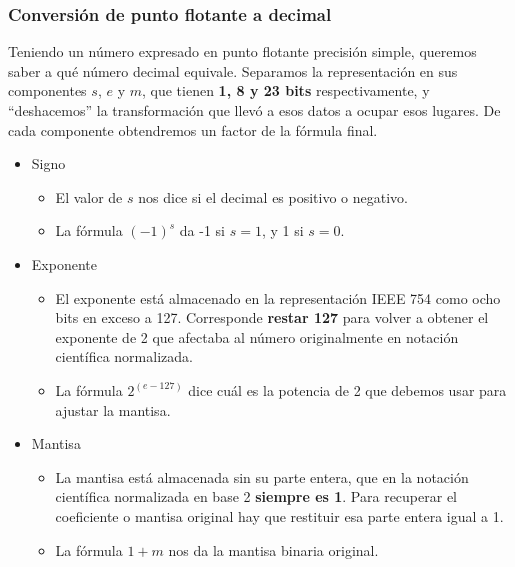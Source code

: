 \documentclass[spanish,A4,]{article}
\begin{document}
\subsubsection{Conversión de punto flotante a
decimal}\label{conversiuxf3n-de-punto-flotante-a-decimal}

Teniendo un número expresado en punto flotante precisión simple,
queremos saber a qué número decimal equivale. Separamos la
representación en sus componentes $s$, $e$ y $m$, que tienen \textbf{1,
8 y 23 bits} respectivamente, y ``deshacemos'' la transformación que
llevó a esos datos a ocupar esos lugares. De cada componente obtendremos
un factor de la fórmula final.

\begin{itemize}
\itemsep1pt\parskip0pt
\item
  Signo

  \begin{itemize}
  \itemsep1pt\parskip0pt
  \item
    El valor de $s$ nos dice si el decimal es positivo o negativo.
  \item
    La fórmula $(-1)^s$ da -1 si $s=1$, y 1 si $s=0$.
  \end{itemize}
\item
  Exponente

  \begin{itemize}
  \itemsep1pt\parskip0pt
  \item
    El exponente está almacenado en la representación IEEE 754 como ocho
    bits en exceso a 127. Corresponde \textbf{restar 127} para volver a
    obtener el exponente de 2 que afectaba al número originalmente en
    notación científica normalizada.
  \item
    La fórmula $2^{(e - 127)}$ dice cuál es la potencia de 2 que debemos
    usar para ajustar la mantisa.
  \end{itemize}
\item
  Mantisa

  \begin{itemize}
  \itemsep1pt\parskip0pt
  \item
    La mantisa está almacenada sin su parte entera, que en la notación
    científica normalizada en base 2 \textbf{siempre es 1}. Para
    recuperar el coeficiente o mantisa original hay que restituir esa
    parte entera igual a 1.
  \item
    La fórmula $1 + m$ nos da la mantisa binaria original.
  \end{itemize}
\end{itemize}
\end{document}
